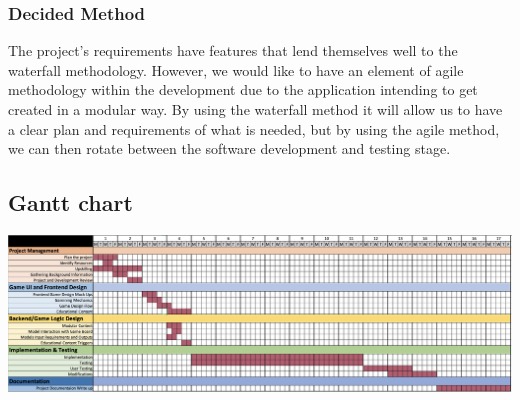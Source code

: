 \documentclass[a4paper,10pt]{article}
\begin{document}
\subsubsection{Decided Method}
The project's requirements have features that lend themselves well to the waterfall methodology. However, we would like to have an element of agile methodology within the development due to the application intending to get created in a modular way. By using the waterfall method it will allow us to have a clear plan and requirements of what is needed, but by using the agile method, we can then rotate between the software development and testing stage.




\begin{landscape}
\subsection{Gantt chart}
	\begin{center}
		\item\includegraphics[width=27cm]{ganttchart.png}
	\end{center}
\end{landscape}
\end{document}
